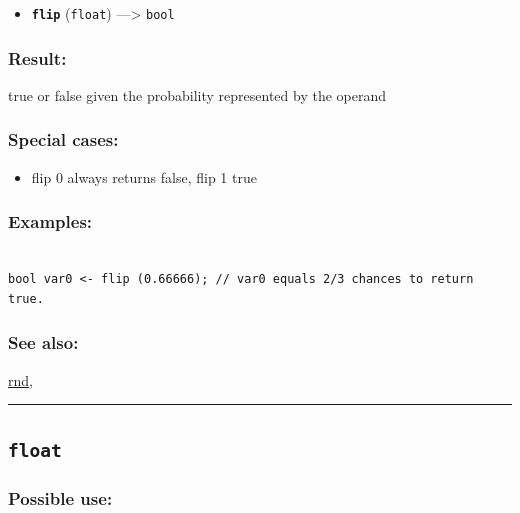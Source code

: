 \documentclass[]{book}
\providecommand{\tightlist}{%
  \setlength{\itemsep}{0pt}\setlength{\parskip}{0pt}}
\theoremstyle{definition}
\theoremstyle{definition}
\theoremstyle{definition}
\theoremstyle{remark}
\begin{document}
\begin{itemize}
\tightlist
\item
  \textbf{\texttt{flip}} (\texttt{float}) ---\textgreater{}
  \texttt{bool}
\end{itemize}

\subsubsection{Result:}\label{result-163}

true or false given the probability represented by the operand

\subsubsection{Special cases:}\label{special-cases-63}

\begin{itemize}
\tightlist
\item
  flip 0 always returns false, flip 1 true
\end{itemize}

\subsubsection{Examples:}\label{examples-125}

\begin{verbatim}
 
bool var0 <- flip (0.66666); // var0 equals 2/3 chances to return true.
\end{verbatim}

\subsubsection{See also:}\label{see-also-96}

\href{operators-n-to-r.html\#rnd}{rnd},

\begin{center}\rule{0.5\linewidth}{\linethickness}\end{center}

\subsection{\texorpdfstring{\texttt{float}}{float}}\label{float}

\subsubsection{Possible use:}\label{possible-use-170}
\end{document}
